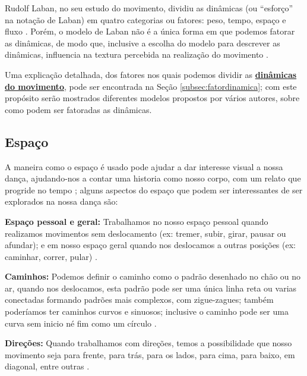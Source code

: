 Rudolf Laban, no seu estudo do movimento, 
dividiu as dinâmicas (ou ``esforço'' na notação de Laban) 
em quatro categorias ou fatores: peso, tempo, espaço e fluxo 
\cite[pp. 5]{carline2011lesson}
\cite[pp. 30]{paine2014complete}.
Porém, o modelo de Laban não é a única forma em que podemos fatorar as dinâmicas,
de modo que, inclusive a escolha do modelo para descrever as dinâmicas,
influencia na textura percebida na realização do movimento \cite[pp. 30]{paine2014complete}. 

Uma explicação detalhada, dos fatores nos quais podemos dividir as 
\hyperref[subsec:fatordinamica]{\textbf{dinâmicas do movimento}},
pode ser encontrada na Seção \ref{subsec:fatordinamica};
com este propósito serão mostrados diferentes modelos propostos por vários autores,
sobre como podem ser fatoradas as dinâmicas.



\subsection{Espaço} 
A maneira como o espaço é usado pode ajudar a dar interesse visual a nossa dança,
ajudando-nos a contar uma historia como nosso corpo, com um relato que progride no tempo 
\cite[pp. 6]{carline2011lesson}
\cite[pp. 31]{paine2014complete}
\cite[pp. 131, 136]{mccutchen2006teaching}; 
alguns aspectos do espaço que podem ser interessantes de ser explorados na nossa dança são:

\textbf{Espaço pessoal e geral:}  Trabalhamos no nosso espaço pessoal 
quando realizamos movimentos sem deslocamento 
(ex: tremer, subir, girar, pausar ou afundar);
e em nosso espaço geral quando nos deslocamos a outras posições
(ex: caminhar, correr, pular) \cite[pp. 7]{carline2011lesson}
\cite[pp. 32]{paine2014complete}.

\textbf{Caminhos:} Podemos definir o caminho como o padrão desenhado no chão ou no ar, 
quando nos deslocamos,
esta padrão pode ser uma única linha reta ou 
varias conectadas formando padrões mais complexos, 
 com zigue-zagues; também poderíamos ter caminhos curvos e sinuosos; 
inclusive o caminho pode ser uma curva sem inicio né fim como um círculo 
\cite[pp. 7]{carline2011lesson}
\cite[pp. 32]{paine2014complete}.



\textbf{Direções:} Quando trabalhamos com direções, 
temos a possibilidade que nosso movimento seja 
para frente, para trás, para os lados, para cima, para baixo, em diagonal,
entre outras 
\cite[pp. 7]{carline2011lesson}
\cite[pp. 32]{paine2014complete}
\cite[pp. 97-98]{schrader2005sense}. 


